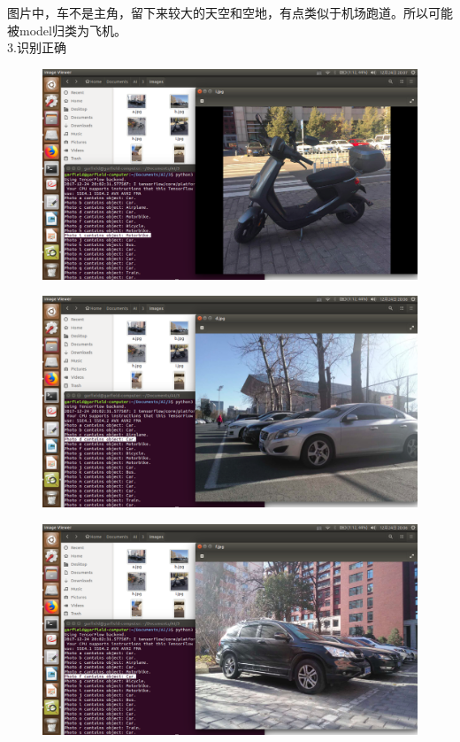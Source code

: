 \documentclass[19pt,a4paper]{article}
\begin{document}
\indent 图片中，车不是主角，留下来较大的天空和空地，有点类似于机场跑道。所以可能被model归类为飞机。\\
\indent 3.识别正确
\begin{figure}[H]
 \centering
 \includegraphics[scale=0.5]{right1.png}
\end{figure}
\begin{figure}[H]
 \centering
 \includegraphics[scale=0.5]{right2.png}
\end{figure}
\begin{figure}[H]
 \centering
 \includegraphics[scale=0.5]{right3.png}
\end{figure}
\end{document}
